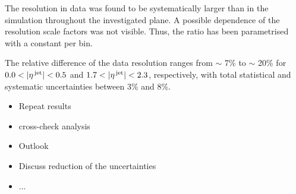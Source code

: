 The resolution in data was found to be systematically larger than in the simulation throughout the investigated \etajet plane. 
A possible \ptgamma dependence of the resolution scale factors was not visible. 
Thus, the ratio has been parametrised with a constant per \etajet bin.

The relative difference of the data resolution ranges from $\sim$ 7\% to $\sim$ 20\% for  $0.0<|\etajet|<0.5$ and  $1.7<|\etajet|<2.3$, respectively, 
with total statistical and systematic uncertainties between 3\% and 8\%.



\begin{itemize}
\item Repeat results
\item cross-check analysis
\item Outlook
\item Discuss reduction of the uncertainties
\item ...
\end{itemize}

